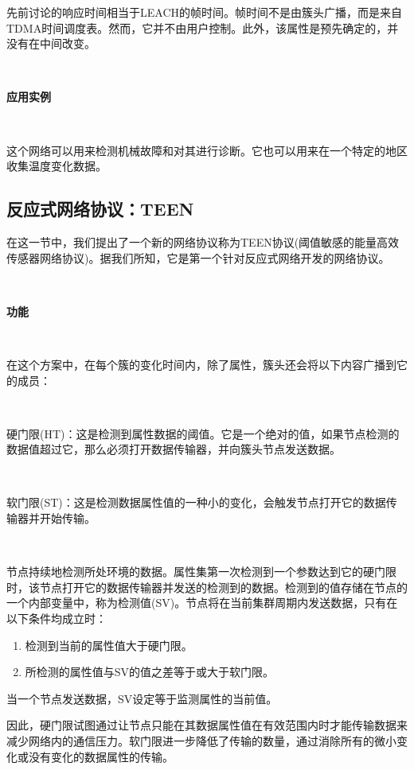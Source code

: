 \documentclass[journal]{IEEEtran}
\begin{document}
\begin{CJK}{UTF8}{gbsn}
先前讨论的响应时间相当于LEACH的帧时间。帧时间不是由簇头广播，而是来自TDMA时间调度表。然而，它并不由用户控制。此外，该属性是预先确定的，并没有在中间改变。

\

\textbf{应用实例}

\

这个网络可以用来检测机械故障和对其进行诊断。它也可以用来在一个特定的地区收集温度变化数据。

\subsection{\textbf{反应式网络协议：TEEN}}

在这一节中，我们提出了一个新的网络协议称为TEEN协议(阈值敏感的能量高效传感器网络协议)。据我们所知，它是第一个针对反应式网络开发的网络协议。

\

\textbf{功能}

\



在这个方案中，在每个簇的变化时间内，除了属性，簇头还会将以下内容广播到它的成员：

\

硬门限(HT)：这是检测到属性数据的阈值。它是一个绝对的值，如果节点检测的数据值超过它，那么必须打开数据传输器，并向簇头节点发送数据。

\

软门限(ST)：这是检测数据属性值的一种小的变化，会触发节点打开它的数据传输器并开始传输。

\

节点持续地检测所处环境的数据。属性集第一次检测到一个参数达到它的硬门限时，该节点打开它的数据传输器并发送的检测到的数据。检测到的值存储在节点的一个内部变量中，称为检测值(SV)。节点将在当前集群周期内发送数据，只有在以下条件均成立时：

\begin{enumerate}
 \setcounter{enumi}
 \item 检测到当前的属性值大于硬门限。
 \item 所检测的属性值与SV的值之差等于或大于软门限。
 
\end{enumerate}

\noindent
当一个节点发送数据，SV设定等于监测属性的当前值。

因此，硬门限试图通过让节点只能在其数据属性值在有效范围内时才能传输数据来减少网络内的通信压力。软门限进一步降低了传输的数量，通过消除所有的微小变化或没有变化的数据属性的传输。


\end{CJK}
\end{document}

